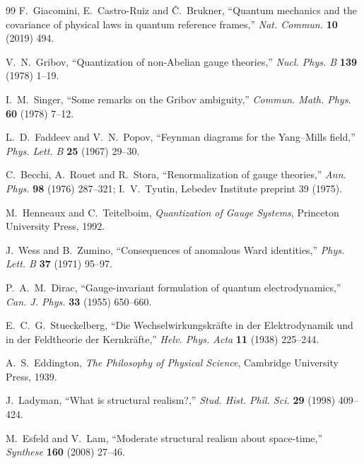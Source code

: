 \documentclass[11pt]{article}
\theoremstyle{plain}
\theoremstyle{definition}
\theoremstyle{remark}
\begin{document}
\begin{thebibliography}{99}
 F.~Giacomini, E.~Castro-Ruiz and \v{C}.~Brukner, ``Quantum mechanics and the covariance of physical laws in quantum reference frames,'' \emph{Nat. Commun.} \textbf{10} (2019) 494.

 V.~N.~Gribov, ``Quantization of non-Abelian gauge theories,'' \emph{Nucl. Phys. B} \textbf{139} (1978) 1--19.

 I.~M.~Singer, ``Some remarks on the Gribov ambiguity,'' \emph{Commun. Math. Phys.} \textbf{60} (1978) 7--12.

 L.~D.~Faddeev and V.~N.~Popov, ``Feynman diagrams for the Yang--Mills field,'' \emph{Phys. Lett. B} \textbf{25} (1967) 29--30.

 C.~Becchi, A.~Rouet and R.~Stora, ``Renormalization of gauge theories,'' \emph{Ann. Phys.} \textbf{98} (1976) 287--321; I.~V.~Tyutin, Lebedev Institute preprint 39 (1975).

 M.~Henneaux and C.~Teitelboim, \emph{Quantization of Gauge Systems}, Princeton University Press, 1992.

 J.~Wess and B.~Zumino, ``Consequences of anomalous Ward identities,'' \emph{Phys. Lett. B} \textbf{37} (1971) 95--97.

 P.~A.~M.~Dirac, ``Gauge-invariant formulation of quantum electrodynamics,'' \emph{Can. J. Phys.} \textbf{33} (1955) 650--660.

 E.~C.~G.~Stueckelberg, ``Die Wechselwirkungskräfte in der Elektrodynamik und in der Feldtheorie der Kernkräfte,'' \emph{Helv. Phys. Acta} \textbf{11} (1938) 225--244.

 A.~S.~Eddington, \emph{The Philosophy of Physical Science}, Cambridge University Press, 1939.

 J.~Ladyman, ``What is structural realism?,'' \emph{Stud. Hist. Phil. Sci.} \textbf{29} (1998) 409--424.

 M.~Esfeld and V.~Lam, ``Moderate structural realism about space-time,'' \emph{Synthese} \textbf{160} (2008) 27--46.

\end{thebibliography}
\end{document}
